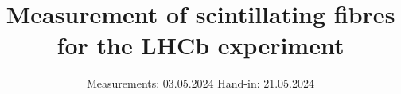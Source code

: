

\subject{Advanced Laboratory course}
\title{Measurement of scintillating fibres for the LHCb experiment}
\date{%
  Measurements: 03.05.2024
  \hspace{3em}
  Hand-in: 21.05.2024
}



\maketitle
\thispagestyle{empty}
\tableofcontents
\newpage






\printbibliography{}


